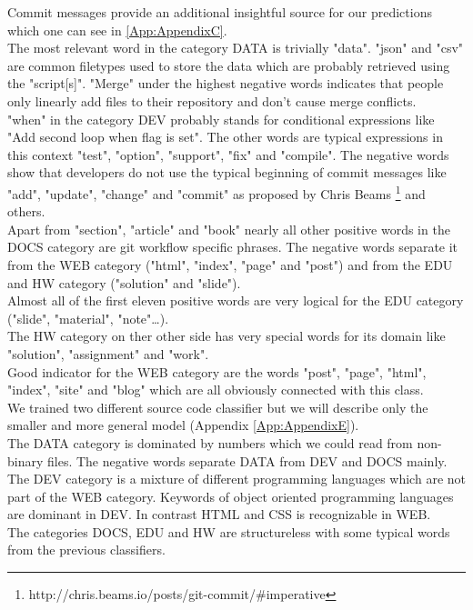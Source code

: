 \documentclass[%
a4paper,
DIV12,
2.5headlines,
bigheadings,
titlepage,
openbib,
]{scrartcl}
\begin{document}
Commit messages provide an additional insightful source for our predictions which one can see in \ref{App:AppendixC}.\\
The most relevant word in the category DATA is trivially "data".
"json" and "csv" are common filetypes used to store the data which are probably retrieved using the "script[s]".
"Merge" under the highest negative words indicates that people only linearly add files to their repository and don't cause merge conflicts.\\
"when" in the category DEV probably stands for conditional expressions like "Add second loop when flag is set".
The other words are typical expressions in this context "test", "option", "support", "fix" and "compile".
The negative words show that developers do not use the typical beginning of commit messages like "add", "update", "change" and "commit" as proposed by Chris Beams \footnote{http://chris.beams.io/posts/git-commit/\#imperative} and others.\\
Apart from "section", "article" and "book" nearly all other positive words in the DOCS category are git workflow specific phrases.
The negative words separate it from the WEB category ("html", "index", "page" and "post") and from the EDU and HW category ("solution" and "slide").\\
Almost all of the first eleven positive words are very logical for the EDU category ("slide", "material", "note"\dots).\\
The HW category on ther other side has very special words for its domain like "solution", "assignment" and "work".\\
Good indicator for the WEB category are the words "post", "page", "html", "index", "site" and "blog" which are all obviously connected with this class.\\

We trained two different source code classifier but we will describe only the smaller and more general model (Appendix \ref{App:AppendixE}).\\
The DATA category is dominated by numbers which we could read from non-binary files.
The negative words separate DATA from DEV and DOCS mainly.\\
The DEV category is a mixture of different programming languages which are not part of the WEB category.
Keywords of object oriented programming languages are dominant in DEV.
In contrast HTML and CSS is recognizable in WEB.\\
The categories DOCS, EDU and HW are structureless with some typical words from the previous classifiers.
\end{document}
